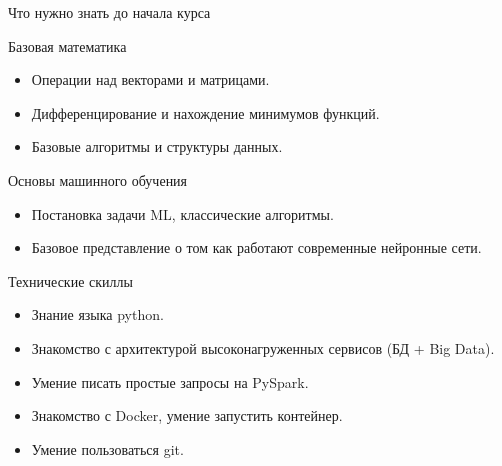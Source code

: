 \documentclass[11pt,aspectratio=169,handout]{beamer}
\begin{document}
\begin{frame}{Что нужно знать до начала курса}

\begin{footnotesize}

Базовая математика
\begin{itemize}
\item Операции над векторами и матрицами.
\item Дифференцирование и нахождение минимумов функций.
\item Базовые алгоритмы и структуры данных.
\end{itemize}

Основы машинного обучения
\begin{itemize}
\item Постановка задачи ML, классические алгоритмы.
\item Базовое представление о том как работают современные нейронные сети.
\end{itemize}

Технические скиллы
\begin{itemize}
\item Знание языка python.
\item Знакомство с архитектурой высоконагруженных сервисов (БД + Big Data).
\item Умение писать простые запросы на PySpark.
\item Знакомство с Docker, умение запустить контейнер.
\item Умение пользоваться git.
\end{itemize}

\end{footnotesize}

\end{frame}
\end{document}
